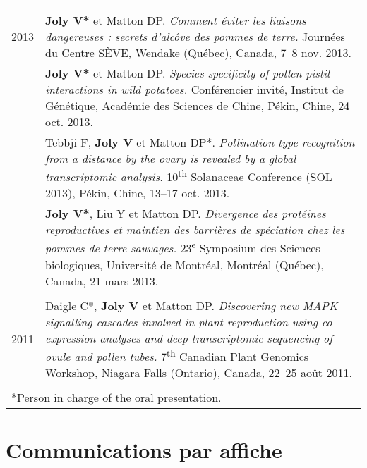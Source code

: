 \documentclass[letterpaper,10pt]{article}
\begin{document}
{\begin{tabular}{r|p{14.1cm}}
\multicolumn{2}{c}{} \\

2013

& \textbf{Joly V*} et Matton DP. \emph{Comment éviter les liaisons dangereuses : secrets d’alcôve des pommes de terre.} Journées du Centre SÈVE, Wendake (Québec), Canada, 7--8 nov. 2013. \vspace{1.5mm} \\

& \textbf{Joly V*} et Matton DP. \emph{Species-specificity of pollen-pistil interactions in wild potatoes.} Conférencier invité, Institut de Génétique, Académie des Sciences de Chine, Pékin, Chine, 24 oct. 2013. \vspace{1.5mm} \\

& Tebbji F, \textbf{Joly V} et Matton DP*. \emph{Pollination type recognition from a distance by the ovary is revealed by a global transcriptomic analysis.} 10\textsuperscript{th} Solanaceae Conference (SOL 2013), Pékin, Chine, 13--17 oct. 2013. \vspace{1.5mm} \\

& \textbf{Joly V*}, Liu Y et Matton DP. \emph{Divergence des protéines reproductives et maintien des barrières de spéciation chez les pommes de terre sauvages.} 23\textsuperscript{e} Symposium des Sciences biologiques, Université de Montréal, Montréal (Québec), Canada, 21 mars 2013. \\

\multicolumn{2}{c}{} \\

2011

& Daigle C*, \textbf{Joly V} et Matton DP. \emph{Discovering new MAPK signalling cascades involved in plant reproduction using co-expression analyses and deep transcriptomic sequencing of ovule and pollen tubes.} 7\textsuperscript{th} Canadian Plant Genomics Workshop, Niagara Falls (Ontario), Canada, 22--25 août 2011. \\

\multicolumn{2}{l}{\vspace{0.5mm}} \\
\multicolumn{2}{l}{*Person in charge of the oral presentation.}
\end{tabular}


\section{Communications par affiche}
\begin{tabular}{r|p{14.1cm}}


\end{tabular}}
\end{document}
